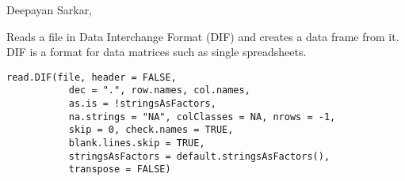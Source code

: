 %
\begin{Author}\relax
 Deepayan Sarkar,  
\end{Author}
%
\begin{Description}\relax
Reads a file in Data Interchange Format (DIF) and creates a data frame
from it.  DIF is a format for data matrices such as single spreadsheets.
\end{Description}
%
\begin{Usage}
\begin{verbatim}
read.DIF(file, header = FALSE,
           dec = ".", row.names, col.names,
           as.is = !stringsAsFactors,
           na.strings = "NA", colClasses = NA, nrows = -1,
           skip = 0, check.names = TRUE,
           blank.lines.skip = TRUE,
           stringsAsFactors = default.stringsAsFactors(),
           transpose = FALSE)
\end{verbatim}
\end{Usage}
%
